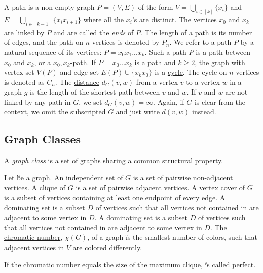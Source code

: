 \begin{definition}
    A path is a non-empty graph $P = (V,E)$ of the form $V = \bigcup_{i  \in [k]} \{x_i\}$ and $E = \bigcup_{i \in  [k-1]} \{x_ix_{i+1}\}$ where all the $x_i$'s are distinct. 
    The vertices $x_0$ and $x_k$ are \underline{linked} by $P$ and are called the \textit{ends} of $P$. The \underline{length} of a path is its number of edges, and the path on $n$ vertices is denoted by  $P_n$. 
    We refer to a path $P$ by a natural sequence of its vertices: $P = x_0x_1...x_k$. Such a path $P$ is a path between $x_0$ and $x_k$, or a $x_0,x_k$-path.
    If $P = x_0...x_k$ is a path and $k \geq 2$, the graph with vertex set $V(P)$ and edge set $E(P) \cup \{x_kx_0\}$ is a \underline{cycle}. The cycle on $n$ vertices is denoted as $C_n$.
    The \underline{distance} $d_G(v,w)$ from a vertex $v$ to a vertex $w$ in a graph $g$ is the length of the shortest path between $v$ and $w$. If $v$ and $w$ are not linked by any path in $G$, we set $d_G(v,w) = \infty$. Again, if $G$ is clear from the context, we omit the subscripted $G$ and just write $d(v,w)$ instead.
\end{definition}

\subsection*{Graph Classes}

A \textit{graph class} is a set of graphs sharing a common structural property.

\begin{definition}
Let \G be a graph.
An  \underline{independent set} of $G$ is a set of pairwise non-adjacent vertices. 
A \underline{clique} of $G$ is a set of pairwise adjacent vertices. 
A \underline{vertex cover} of $G$ is a subset of vertices containing at least one endpoint of every edge. 
A \underline{dominating set} is a subset $D$ of vertices such that all vertices not contained in are adjacent to some vertex in $D$.
A \underline{dominating set} is a subset $D$ of vertices such that all vertices not contained in are adjacent to some vertex in $D$.
The \underline{chromatic number}, $\chi(G)$, of a graph \G is the smallest number of colors, such that adjacent vertices in $V$ are colored differently.

\end{definition}

\begin{graphclass}
If the chromatic number equals the size of the maximum clique, \G is called \underline{perfect}. 
\end{graphclass}

